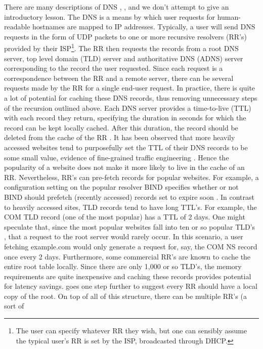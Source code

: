 \documentclass[sigconf,nonacm,10pt]{acmart}
\begin{document}
There are many descriptions of DNS \cite{kurose2010computer},
\cite{cloudflare_dns_tutorial}, and we don't attempt to give an
introductory lesson. The DNS is a means by which user requests for
human-readable hostnames are mapped to IP addresses. Typically, a user
will send DNS requests in the form of UDP packets to one or more
recursive resolvers (RR's) provided by their
ISP\footnote{ The user can specify whatever RR they wish, but one can sensibly assume the typical user's RR is set by the ISP, broadcasted through DHCP. }.
The RR then requests the records from a root DNS server, top level
domain (TLD) server and authoritative DNS (ADNS) server corresponding to
the record the user requested. Since each request is a correspondence
between the RR and a remote server, there can be several requests made
by the RR for a single end-user request. \break \break
In practice, there is quite a lot of potential for caching these DNS
records, thus removing unnecessary steps of the recursion outlined
above. Each DNS server provides a time-to-live (TTL) with each record
they return, specifying the duration in seconds for which the record can
be kept locally cached. After this duration, the record should be
deleted from the cache of the RR \cite{rfc_1035}. It has been observed
that more heavily accessed websites tend to purposefully set the TTL of
their DNS records to be some small value, evidence of fine-grained
traffic engineering \cite{callahan2013modern}. Hence the popularity of a
website does not make it more likely to live in the cache of an RR.
Nevertheless, RR's can pre-fetch records for popular websites. For
example, a configuration setting on the popular resolver BIND specifies
whether or not BIND should prefetch (recently accessed) records set to
expire soon \cite{bind9_config}. In contrast to heavily accessed sites,
TLD records tend to have long TTL's. For example, the COM TLD record
(one of the most popular) has a TTL of 2 days. One might speculate that,
since the most popular websites fall into ten or so popular TLD's
\cite{alexa_topsites}, that a request to the root server would rarely
occur. In this scenario, a user fetching example.com would only generate
a request for, say, the COM NS record once every 2 days. Furthermore,
some commercial RR's are known to cache the entire root table locally.
Since there are only 1,000 or so TLD's, the memory requirements are
quite inexpensive and caching these records provides potential for
latency savings. \cite{allman_eliminate} goes one step further to
suggest every RR should have a local copy of the root. \break
On top of all of this structure, there can be multiple RR's (a sort of
\end{document}
